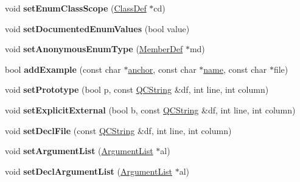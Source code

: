 \begin{DoxyCompactItemize}
\item 
\mbox{\label{class_member_def_a26523e3913336b997eecc967390c28c9}} 
void {\bfseries set\+Enum\+Class\+Scope} (\mbox{\hyperlink{class_class_def}{Class\+Def}} $\ast$cd)
\item 
\mbox{\label{class_member_def_a37b03f99ebbd0aef3b66236a39f542b3}} 
void {\bfseries set\+Documented\+Enum\+Values} (bool value)
\item 
\mbox{\label{class_member_def_a20fe732daa20d651f2ec06b1f7409d38}} 
void {\bfseries set\+Anonymous\+Enum\+Type} (\mbox{\hyperlink{class_member_def}{Member\+Def}} $\ast$md)
\item 
\mbox{\label{class_member_def_aec3154d3fd600954a9c18e5d2f75228c}} 
bool {\bfseries add\+Example} (const char $\ast$\mbox{\hyperlink{class_member_def_a1ef7c726fdd0f1dd2d006782dd6f766a}{anchor}}, const char $\ast$\mbox{\hyperlink{class_definition_a9324000f785d7b6b098878a3bca4df5b}{name}}, const char $\ast$file)
\item 
\mbox{\label{class_member_def_a586d4f98fd17ca2611bd8e3968f920ce}} 
void {\bfseries set\+Prototype} (bool p, const \mbox{\hyperlink{class_q_c_string}{Q\+C\+String}} \&df, int line, int column)
\item 
\mbox{\label{class_member_def_a09bcf5c5e7cdecbf14421c65decff8e8}} 
void {\bfseries set\+Explicit\+External} (bool b, const \mbox{\hyperlink{class_q_c_string}{Q\+C\+String}} \&df, int line, int column)
\item 
\mbox{\label{class_member_def_a448f1f85eefb426326772bd40017c0ad}} 
void {\bfseries set\+Decl\+File} (const \mbox{\hyperlink{class_q_c_string}{Q\+C\+String}} \&df, int line, int column)
\item 
\mbox{\label{class_member_def_a5c55ef409d18fc50c374554eacb36583}} 
void {\bfseries set\+Argument\+List} (\mbox{\hyperlink{class_argument_list}{Argument\+List}} $\ast$al)
\item 
\mbox{\label{class_member_def_a7bbb6e2413e2ff280adee70b31ce06c8}} 
void {\bfseries set\+Decl\+Argument\+List} (\mbox{\hyperlink{class_argument_list}{Argument\+List}} $\ast$al)

\end{DoxyCompactItemize}
